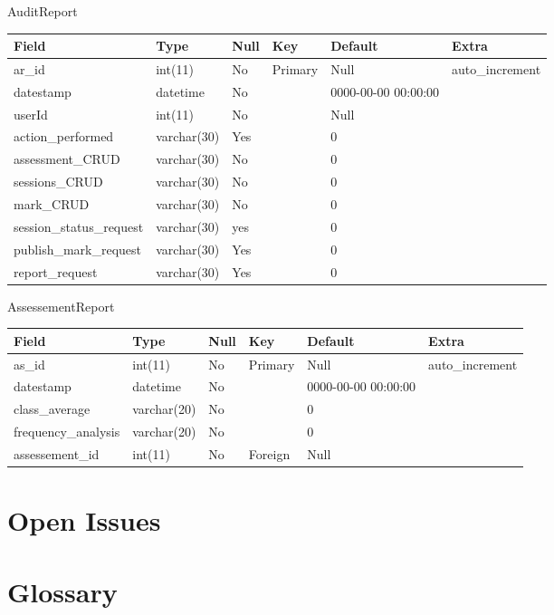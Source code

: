 \documentclass[12pt]{article}
\begin{document}
					
					
					\caption{AuditReport}
					\begin{tabular}{|p{1.1in}|p{0.9in}|p{0.5in}|p{0.4in}|p{1.0in}|p{0.9in}|} \hline 
					Field & Type & Null & Key & Default & Extra \\ \hline 
					ar\_id & int(11) & No & Primary & Null & auto\_increment \\ \hline 
					datestamp & datetime & No &  & 0000-00-00 00:00:00 &  \\ \hline 
					userId & int(11) & No &  & Null &  \\ \hline 
					action\_performed & varchar(30) & Yes &  & 0 &  \\ \hline 
					assessment\_CRUD & varchar(30) & No &  & 0 &  \\ \hline 
					sessions\_CRUD & varchar(30) & No &  & 0 &  \\ \hline 
					mark\_CRUD & varchar(30) & No &  & 0 &  \\ \hline 
					session\_status\_request & varchar(30) & yes &  & 0 &  \\ \hline 
					publish\_mark\_request & varchar(30) & Yes &  & 0 &  \\ \hline 
					report\_request & varchar(30) & Yes &  & 0 &  \\ \hline 
					\end{tabular}
					
					
					\caption{AssessementReport} 
					\begin{tabular}{|p{1.0in}|p{1.0in}|p{0.4in}|p{0.4in}|p{1.0in}|p{0.9in}|} \hline 
					Field & Type & Null & Key & Default & Extra \\ \hline 
					as\_id & int(11) & No & Primary & Null & auto\_increment \\ \hline 
					datestamp & datetime & No &  & 0000-00-00 00:00:00 &  \\ \hline 
					class\_average & varchar(20) & No &  & 0 &  \\ \hline 
					frequency\_analysis & varchar(20) & No &  & 0 &  \\ \hline 
					assessement\_id & int(11) & No & Foreign & Null &  \\ \hline 
					\end{tabular}
				\vspace{0.2in}
			
			
	
	\section{Open Issues}
	
		\vspace{0.2in}
		
		
	\newpage
	\section{Glossary}
	
		\vspace{0.2in}
		
			
	
	
\end{document}
